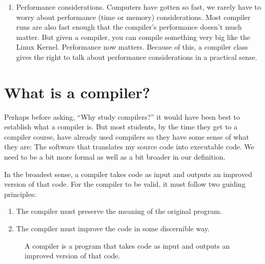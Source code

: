 \documentclass[letterpaper,12pt,openany,reqno]{book}%
\newcommand{\code}[1] {\lstinline[breaklines=yes,breakatwhitespace=yes]{#1}}
\begin{document}
\begin{enumerate}
\item Performance considerations. Computers have gotten so fast, we rarely have to worry about performance (time or memory) considerations. Most compiler runs are also fast enough that the compiler's performance doesn't much matter. But given a compiler, you can compile something very big like the Linux Kernel. Performance now matters. Because of this, a compiler class gives the right to talk about performance considerations in a practical sense.

\end{enumerate}

\section{What is a compiler?}
Perhaps before asking, ``Why study compilers?'' it would have been best to establish what a compiler is. But most students, by the time they get to a compiler course, have already used compilers so they have some sense of what they are: The software that translates my source code into executable code. We need to be a bit more formal as well as a bit broader in our definition.

In the broadest sense, a compiler takes code as input and outputs an improved version of that code. For the compiler to be valid, it must follow two guiding principles:
\begin{enumerate}
\item The compiler must preserve the meaning of the original program.
\item The compiler must improve the code in some discernible way.
\end{enumerate}


\begin{figure}[hbt]
\centering
{}
 \caption[What is a Compiler]{A compiler is a program that takes code as input and outputs an improved version of that code.}
  \label{F.whatiscompiler}
\end{figure}
\end{document}
